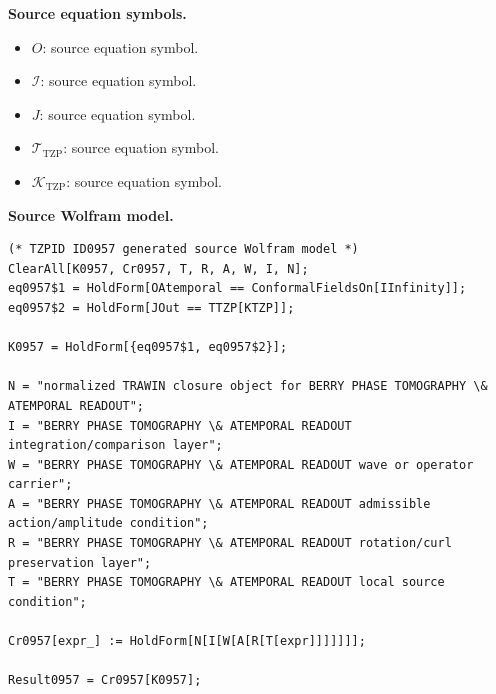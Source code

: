 \begin{minipage}[t]{0.49\linewidth}
\begingroup
\small
\raggedright
\textbf{Source equation symbols.}\par
\begin{itemize}[leftmargin=1.35em,itemsep=1pt,topsep=1pt,parsep=0pt]
    \item $O$: source equation symbol.
    \item $\mathcal{I}$: source equation symbol.
    \item $J$: source equation symbol.
    \item $\mathcal{T}_{\mathrm{TZP}}$: source equation symbol.
    \item $\mathcal{K}_{\mathrm{TZP}}$: source equation symbol.
\end{itemize}
\endgroup
\end{minipage}\hfill
\begin{minipage}[t]{0.47\linewidth}
\begingroup
\scriptsize
\raggedright
\textbf{Source Wolfram model.}\par
\begin{Verbatim}[fontsize=\tiny,breaklines=true,breakanywhere=true]
(* TZPID ID0957 generated source Wolfram model *)
ClearAll[K0957, Cr0957, T, R, A, W, I, N];
eq0957$1 = HoldForm[OAtemporal == ConformalFieldsOn[IInfinity]];
eq0957$2 = HoldForm[JOut == TTZP[KTZP]];

K0957 = HoldForm[{eq0957$1, eq0957$2}];

N = "normalized TRAWIN closure object for BERRY PHASE TOMOGRAPHY \& ATEMPORAL READOUT";
I = "BERRY PHASE TOMOGRAPHY \& ATEMPORAL READOUT integration/comparison layer";
W = "BERRY PHASE TOMOGRAPHY \& ATEMPORAL READOUT wave or operator carrier";
A = "BERRY PHASE TOMOGRAPHY \& ATEMPORAL READOUT admissible action/amplitude condition";
R = "BERRY PHASE TOMOGRAPHY \& ATEMPORAL READOUT rotation/curl preservation layer";
T = "BERRY PHASE TOMOGRAPHY \& ATEMPORAL READOUT local source condition";

Cr0957[expr_] := HoldForm[N[I[W[A[R[T[expr]]]]]]];

Result0957 = Cr0957[K0957];
\end{Verbatim}
\endgroup
\end{minipage}

